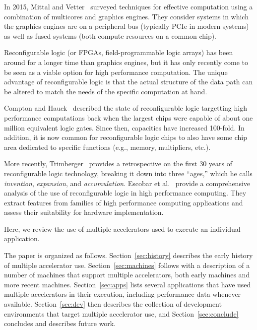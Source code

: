 In 2015, Mittal and Vetter~\cite{mv15} surveyed techniques for effective
computation using a combination of multicores and graphics engines. They
consider systems in which the graphics engines are on a peripheral bus
(typically PCIe in modern systems) as well as fused systems (both compute
resources on a common chip).

Reconfigurable logic (or FPGAs, field-programmable logic arrays) has been
around for a longer time than graphics engines, but it has only recently come
to be seen as a viable option for high performance computation.
The unique advantage of reconfigurable logic is that the actual 
structure of the data path can be altered to match the needs of the specific
computation at hand.

Compton and Hauck~\cite{ch02} described the state of reconfigurable logic
targetting high performance computations back when the largest chips were
capable of about one million equivalent logic gates.  Since then, capacities
have increased 100-fold.  In addition, it is now common for reconfigurable
logic chips to also have some chip area dedicated to specific functions (e.g.,
memory, multipliers, etc.).

More recently, Trimberger~\cite{Trimberger15} provides a retrospective on
the first 30 years of reconfigurable logic technology, breaking it down into
three ``ages,'' which he calls \emph{invention}, \emph{expansion}, and
\emph{accumulation}.  Escobar et al.~\cite{ecv16} provide a comprehensive
analysis of the use of reconfigurable logic in high performance computing.
They extract features from families of high performance computing
applications and assess their suitability for hardware implementation.

Here, we review the use of multiple accelerators used to execute an individual
application. 

The paper is organized as follows.  Section~\ref{sec:history} describes
the early history of multiple accelerator use.  Section~\ref{sec:machines}
follows with a description of a number of machines that support multiple
accelerators, both early machines and more recent machines.
Section~\ref{sec:apps} lists several applications that have used
multiple accelerators in their execution, including performance data
whenever available.
Section~\ref{sec:dev} then describes the collection of development
environments that target multiple accelerator use, and
Section~\ref{sec:conclude} concludes and describes future work.